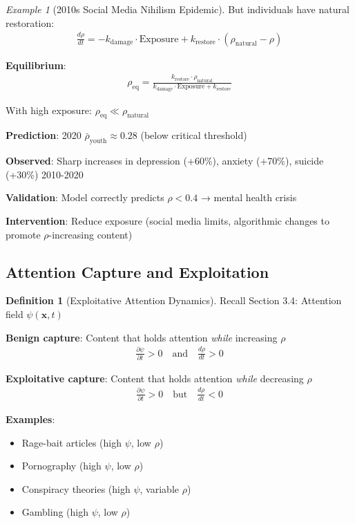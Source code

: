 \documentclass[11pt,a4paper]{article}
\theoremstyle{definition}
\newtheorem{definition}{Definition}[section]
\theoremstyle{remark}
\newtheorem{example}{Example}[section]
\begin{document}
\begin{small}
\begin{enumerate}
\begin{example}[2010s Social Media Nihilism Epidemic]
But individuals have natural restoration:
\begin{align}
\frac{d\rho}{dt} = -k_{\text{damage}} \cdot \text{Exposure} + k_{\text{restore}} \cdot (\rho_{\text{natural}} - \rho)
\end{align}

\textbf{Equilibrium}:
\begin{align}
\rho_{\text{eq}} = \frac{k_{\text{restore}} \cdot \rho_{\text{natural}}}{k_{\text{damage}} \cdot \text{Exposure} + k_{\text{restore}}}
\end{align}

With high exposure: \(\rho_{\text{eq}} \ll \rho_{\text{natural}}\)

\textbf{Prediction}: 2020 \(\bar{\rho}_{\text{youth}} \approx 0.28\) (below critical threshold)

\textbf{Observed}: Sharp increases in depression (+60\%), anxiety (+70\%), suicide (+30\%) 2010-2020

\textbf{Validation}: Model correctly predicts \(\rho < 0.4\) → mental health crisis

\textbf{Intervention}: Reduce exposure (social media limits, algorithmic changes to promote \(\rho\)-increasing content)
\end{example}

\subsection{Attention Capture and Exploitation}

\begin{definition}[Exploitative Attention Dynamics]
Recall Section 3.4: Attention field \(\psi(\mathbf{x}, t)\)

\textbf{Benign capture}: Content that holds attention \textit{while} increasing \(\rho\)
\begin{align}
\frac{\partial \psi}{\partial t} > 0 \quad \text{and} \quad \frac{d\rho}{dt} > 0
\end{align}

\textbf{Exploitative capture}: Content that holds attention \textit{while} decreasing \(\rho\)
\begin{align}
\frac{\partial \psi}{\partial t} > 0 \quad \text{but} \quad \frac{d\rho}{dt} < 0
\end{align}

\textbf{Examples}:
\begin{itemize}
    \item Rage-bait articles (high \(\psi\), low \(\rho\))
    \item Pornography (high \(\psi\), low \(\rho\))
    \item Conspiracy theories (high \(\psi\), variable \(\rho\))
    \item Gambling (high \(\psi\), low \(\rho\))
\end{itemize}


\end{definition}
\end{enumerate}
\end{small}
\end{document}
